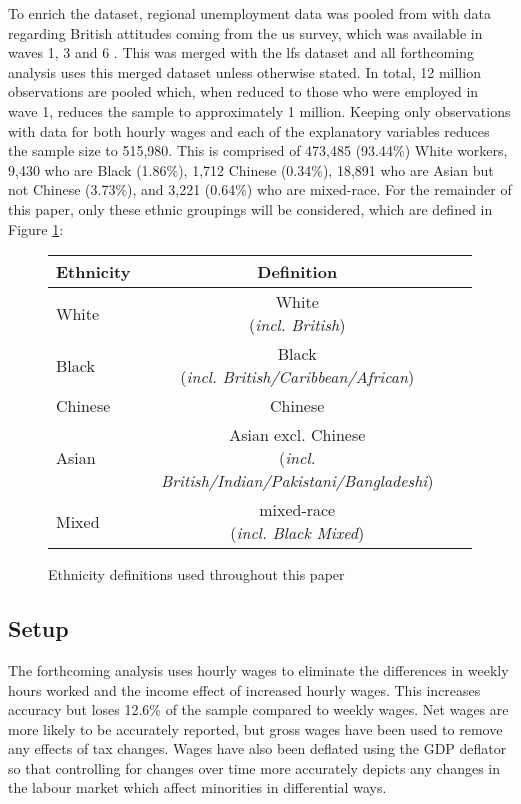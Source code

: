\documentclass[class=article, crop=false]{standalone}
\begin{document}
To enrich the dataset, regional unemployment data was pooled from \citet{ONSf} with data regarding British attitudes coming from the \acrfull{us} survey, which was available in waves 1, 3 and 6 \citep{US}. This was merged with the \acrshort{lfs} dataset and all forthcoming analysis uses this merged dataset unless otherwise stated. In total, 12 million observations are pooled which, when reduced to those who were employed in wave 1, reduces the sample to approximately 1 million. Keeping only observations with data for both hourly wages and each of the explanatory variables reduces the sample size to 515,980. This is comprised of 473,485 (93.44\%) White workers, 9,430 who are Black (1.86\%), 1,712 Chinese (0.34\%), 18,891 who are  Asian but not Chinese (3.73\%), and 3,221 (0.64\%) who are mixed-race. For the remainder of this paper, only these ethnic groupings will be considered, which are defined in Figure \ref{fig:ethnicity_definitions}:
\begin{figure}[h!]
    \begin{center}
        \begin{tabular}{l*{2}{c}}
            \hline\hline
            \textbf{Ethnicity} & \textbf{Definition} \\
            \hline
            White & \makecell{White \\(\textit{incl. British})} \\
            Black & \makecell{Black \\(\textit{incl. British/Caribbean/African})} \\
            Chinese & Chinese \\
            Asian & \makecell{Asian excl. Chinese \\(\textit{incl. British/Indian/Pakistani/Bangladeshi})} \\
            Mixed & \makecell{mixed-race \\(\textit{incl. Black Mixed})} \\
            \hline\hline
        \end{tabular}
    \end{center}
    \caption{Ethnicity definitions used throughout this paper}
    \label{fig:ethnicity_definitions}
\end{figure}

\subsection{Setup}
\label{sec:Setup}
The forthcoming analysis uses hourly wages to eliminate the differences in weekly hours worked and the income effect of increased hourly wages. This increases accuracy but loses 12.6\% of the sample compared to weekly wages. Net wages are more likely to be accurately reported, but gross wages have been used to remove any effects of tax changes. Wages have also been deflated using the GDP deflator \citep{ONSh} so that controlling for changes over time more accurately depicts any changes in the labour market which affect minorities in differential ways. 
\end{document}
